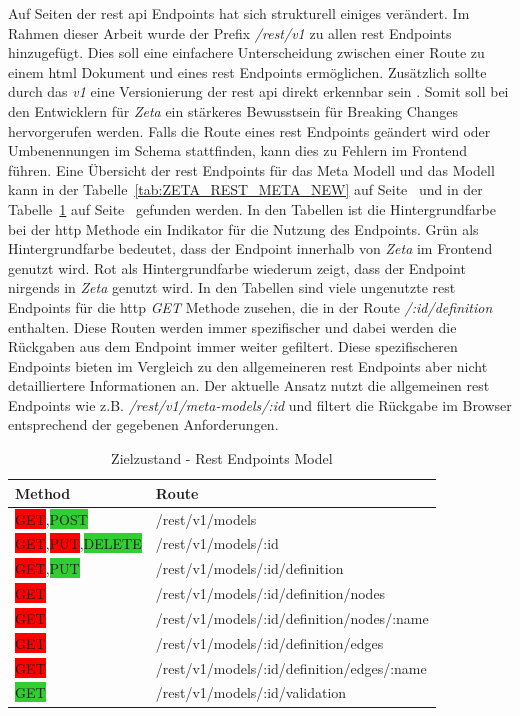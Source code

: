 Auf Seiten der \ac{rest} \ac{api} Endpoints hat sich strukturell einiges verändert. Im Rahmen dieser Arbeit wurde der Prefix \textit{/rest/v1} zu allen \ac{rest} Endpoints hinzugefügt. Dies soll eine einfachere Unterscheidung zwischen einer Route zu einem \ac{html} Dokument und eines \ac{rest} Endpoints ermöglichen. Zusätzlich sollte durch das \textit{v1} eine Versionierung der \ac{rest} \ac{api} direkt erkennbar sein \cite{webservice_versioning}. Somit soll bei den Entwicklern für \textit{Zeta} ein stärkeres Bewusstsein für Breaking Changes hervorgerufen werden. Falls die Route eines \ac{rest} Endpoints geändert wird oder Umbenennungen im Schema stattfinden, kann dies zu Fehlern im Frontend führen. Eine Übersicht der \ac{rest} Endpoints für das Meta Modell und das Modell kann in der Tabelle~\ref{tab:ZETA_REST_META_NEW} auf Seite~\pageref{tab:ZETA_REST_META_NEW} und in der Tabelle~\ref{tab:ZETA_REST_MODEL_NEW} auf Seite~\pageref{tab:ZETA_REST_MODEL_NEW} gefunden werden. In den Tabellen ist die Hintergrundfarbe bei der \ac{http} Methode ein Indikator für die Nutzung des Endpoints. Grün als Hintergrundfarbe bedeutet, dass der Endpoint innerhalb von \textit{Zeta} im Frontend genutzt wird. Rot als Hintergrundfarbe wiederum zeigt, dass der Endpoint nirgends in \textit{Zeta} genutzt wird. In den Tabellen sind viele ungenutzte \ac{rest} Endpoints für die \ac{http} \textit{GET} Methode zusehen, die in der Route \textit{/:id/definition} enthalten. Diese Routen werden immer spezifischer und dabei werden die Rückgaben aus dem Endpoint immer weiter gefiltert. Diese spezifischeren Endpoints bieten im Vergleich zu den allgemeineren \ac{rest} Endpoints aber nicht detailliertere Informationen an. Der aktuelle Ansatz nutzt die allgemeinen \ac{rest} Endpoints wie z.B. \textit{/rest/v1/meta-models/:id} und filtert die Rückgabe im Browser entsprechend der gegebenen Anforderungen.   

\begin{table}[ht]
    \smallskip
    \centering
    \begin{tabular}{| l | l |}
    \hline
    \bf Method & \bf Route \\ \hline
    \colorbox{red}{GET},\colorbox{LimeGreen}{POST} & /rest/v1/models \\ \hline
    \colorbox{red}{GET},\colorbox{red}{PUT},\colorbox{LimeGreen}{DELETE} & /rest/v1/models/:id \\ \hline
    \colorbox{red}{GET},\colorbox{LimeGreen}{PUT} & /rest/v1/models/:id/definition \\ \hline
    \colorbox{red}{GET} & /rest/v1/models/:id/definition/nodes \\ \hline
    \colorbox{red}{GET} & /rest/v1/models/:id/definition/nodes/:name \\ \hline
    \colorbox{red}{GET} & /rest/v1/models/:id/definition/edges \\ \hline
    \colorbox{red}{GET} & /rest/v1/models/:id/definition/edges/:name \\ \hline
    \colorbox{LimeGreen}{GET} & /rest/v1/models/:id/validation \\ \hline
    \end{tabular}
    \caption{Zielzustand - Rest Endpoints Model}
    \label{tab:ZETA_REST_MODEL_NEW}
\end{table}

